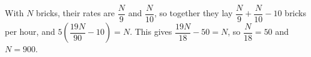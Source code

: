 With $N$ bricks, their rates are $\dfrac {N}{9}$ and $\dfrac {N}{10}$, so together they lay $\dfrac {N}{9}+\dfrac {N}{10}-10$ bricks per hour, and $5\left(\dfrac{19N}{90}-10\right)=N$. This gives $\dfrac{19N}{18}-50=N$, so $\dfrac {N}{18}=50$ and $N=\boxed{900}$.
